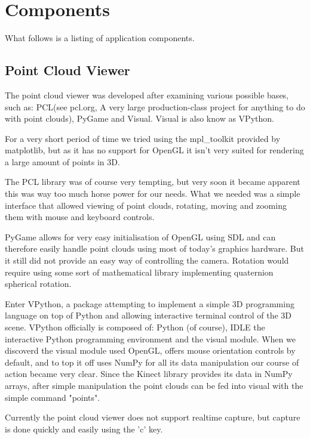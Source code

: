 
\section{Components}

What follows is a listing of application components.

\subsection{Point Cloud Viewer}

The point cloud viewer was developed after examining various possible
bases, such as: PCL(see pcl.org, A very large production-class project for
anything to do with point clouds), PyGame and Visual. Visual is also know
as VPython.

For a very short period of time we tried using the mpl_toolkit provided
by matplotlib, but as it has no support for OpenGL it isn't very suited
for rendering a large amount of points in 3D.

The PCL library was of course
very tempting, but very soon it became apparent this was way too much horse
power for our needs. What we needed was a simple interface that allowed viewing
of point clouds, rotating, moving and zooming them with mouse and keyboard
controls.

PyGame allows for very easy initialisation of OpenGL using SDL and can therefore
easily handle point clouds using most of today's graphics hardware. But it still
did not provide an easy way of controlling the camera. Rotation would require
using some sort of mathematical library implementing quaternion spherical rotation.

Enter VPython, a package attempting to implement a simple 3D programming
language on top of Python and allowing interactive terminal control of the
3D scene. VPython officially is composed of: Python (of course), IDLE the
interactive Python programming environment and the visual module. When we
discoverd the visual module used OpenGL, offers mouse orientation
controls by default, and to top it off uses NumPy for all its data manipulation
our course of action became very clear. Since the Kinect library provides its
data in NumPy arrays, after simple manipulation the point clouds can be fed into
visual with the simple command "points".

Currently the point cloud viewer does not support realtime capture, but capture
is done quickly and easily using the 'c' key.

